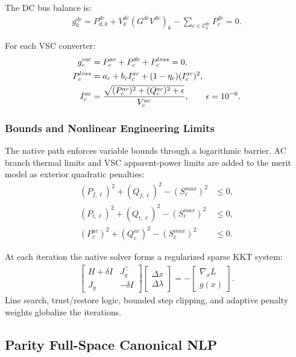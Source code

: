 The DC bus balance is:
\begin{align}
g_k^{dc}=
P_{d,k}^{dc}
 + V_k^{dc}\left(G^{dc}V^{dc}\right)_k
 - \sum_{c\in\mathcal{C}^{dc}_k}P_c^{dc}
=0 .
\end{align}

For each VSC converter:
\begin{align}
g_c^{\mathrm{vsc}}&=P_c^{ac}+P_c^{dc}+P_c^{loss}=0,\\
P_c^{loss}&=a_c+b_c I_c^{ac}+(1-\eta_c)(I_c^{ac})^2,\\
I_c^{ac}&=
\frac{\sqrt{(P_c^{ac})^2+(Q_c^{ac})^2+\epsilon}}{V_c^{ac}},
\qquad \epsilon=10^{-6}.
\end{align}

\subsubsection{Bounds and Nonlinear Engineering Limits}

The native path enforces variable bounds through a logarithmic barrier.  AC
branch thermal limits and VSC apparent-power limits are added to the merit model
as exterior quadratic penalties:
\begin{align}
(P_{f,\ell})^2+(Q_{f,\ell})^2-(S_{\ell}^{max})^2&\le 0,\\
(P_{t,\ell})^2+(Q_{t,\ell})^2-(S_{\ell}^{max})^2&\le 0,\\
(P_c^{ac})^2+(Q_c^{ac})^2-(S_c^{max})^2&\le 0.
\end{align}

At each iteration the native solver forms a regularized sparse KKT system:
\begin{align}
\begin{bmatrix}
H+\delta I & J_g^{\top}\\
J_g & -\delta I
\end{bmatrix}
\begin{bmatrix}
\Delta x\\
\Delta\lambda
\end{bmatrix}
=-
\begin{bmatrix}
\nabla_x L\\
g(x)
\end{bmatrix}.
\end{align}
Line search, trust/restore logic, bounded step clipping, and adaptive penalty
weights globalize the iterations.

\subsection{Parity Full-Space Canonical NLP}

